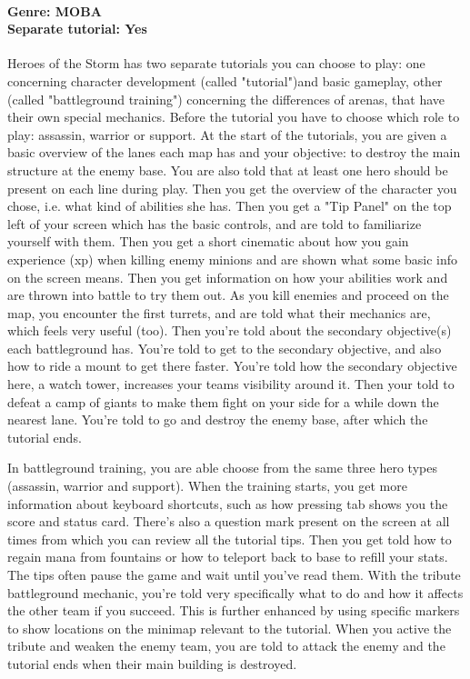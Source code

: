 \paragraph{Genre: MOBA \\ Separate tutorial: Yes \\}
Heroes of the Storm has two separate tutorials you can choose to play: one concerning character development (called "tutorial")and basic gameplay, other (called "battleground training") concerning the differences of arenas, that have their own special mechanics.
Before the tutorial you have to choose which role to play: assassin, warrior or support.
At the start of the tutorials, you are given a basic overview of the lanes each map has and your objective: to destroy the main structure at the enemy base. You are also told that at least one hero should be present on each line during play.
Then you get the overview of the character you chose, i.e. what kind of abilities she has.
Then you get a "Tip Panel" on the top left of your screen which has the basic controls, and are told to familiarize yourself with them.
Then you get a short cinematic about how you gain experience (xp) when killing enemy minions and are shown what some basic info on the screen means.
Then you get information on how your abilities work and are thrown into battle to try them out.
As you kill enemies and proceed on the map, you encounter the first turrets, and are told what their mechanics are, which feels very useful (too).
Then you're told about the secondary objective(s) each battleground has.
You're told to get to the secondary objective, and also how to ride a mount to get there faster.
You're told how the secondary objective here, a watch tower, increases your teams visibility around it.
Then your told to defeat a camp of giants to make them fight on your side for a while down the nearest lane.
You're told to go and destroy the enemy base, after which the tutorial ends.

In battleground training, you are able choose from the same three hero types (assassin, warrior and support).
When the training starts, you get more information about keyboard shortcuts, such as how pressing tab shows you the score and status card.
There's also a question mark present on the screen at all times from which you can review all the tutorial tips.
Then you get told how to regain mana from fountains or how to teleport back to base to refill your stats.
The tips often pause the game and wait until you've read them.
With the tribute battleground mechanic, you're told very specifically what to do and how it affects the other team if you succeed. This is further enhanced by using specific markers to show locations on the minimap relevant to the tutorial.
When you active the tribute and weaken the enemy team, you are told to attack the enemy and the tutorial ends when their main building is destroyed.
